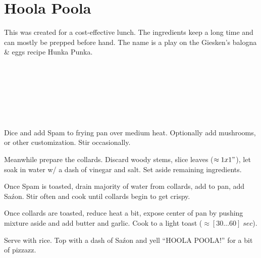 \section{Hoola Poola}
\begin{recipestats}[
	servings=1 person,
	preptime=10 minutes,
	bakingtime=20 minutes,
	]
\end{recipestats}

\begin{recipeabstract}
	This was created for a cost-effective lunch.
	The ingredients keep a long time and can mostly be prepped before hand.
	The name is a play on the Giesken's balogna \& eggs recipe Hunka Punka. %
\end{recipeabstract}

\begin{ingredientcolumns}
	\begin{ingredientblock}
		\\
		\\
		\\
	\end{ingredientblock}
	\begin{ingredientblock}
		\ingredient[\approx \onehalf][\teaspoon]{Sa\'zon}\\
		\ingredient[1][\Tablespoon]{butter}\\
		\ingredient[\onehalf][\Tablespoon]{garlic, minced}
	\end{ingredientblock}
\end{ingredientcolumns}


\begin{preparation}
\item Dice and add Spam to frying pan over medium heat. Optionally add mushrooms, or other customization. Stir occasionally.

\item Meanwhile prepare the collards. Discard woody stems, slice leaves ($\approx1x1"$), let soak in water w/ a dash of vinegar and salt. Set aside remaining ingredients.

\item Once Spam is toasted, drain majority of water from collards, add to pan, add Sa\'zon. Stir often and cook until collards begin to get crispy.

\item Once collards are toasted, reduce heat a bit, expose center of pan by pushing mixture aside and add butter and garlic. Cook to a light toast ($\approx[30\dots 60]\; sec$).

\item Serve with rice. Top with a dash of Sa\'zon and yell ``HOOLA POOLA!'' for a bit of pizzazz.
\end{preparation}

\recipeend
